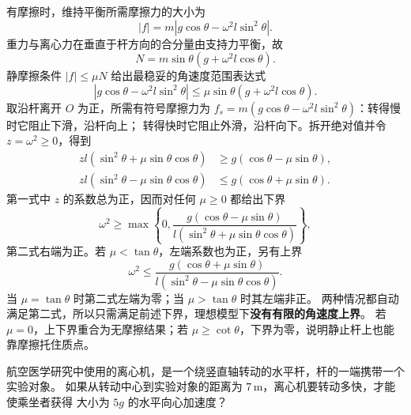 {\begin{xesolution}
有摩擦时，维持平衡所需摩擦力的大小为
\[
 |f|=m\left|g\cos\theta-\omega^2l\sin^2\theta\right|.
\]
重力与离心力在垂直于杆方向的合分量由支持力平衡，故
\[
 N=m\sin\theta\left(g+\omega^2l\cos\theta\right).
\]
静摩擦条件 $|f|\le\mu N$ 给出最稳妥的角速度范围表达式
\[
 \boxed{
 \left|g\cos\theta-\omega^2l\sin^2\theta\right|
 \le\mu\sin\theta\left(g+\omega^2l\cos\theta\right)}.
\]
取沿杆离开 $O$ 为正，所需有符号摩擦力为
$f_s=m(g\cos\theta-\omega^2l\sin^2\theta)$：转得慢时它阻止下滑，沿杆向上；
转得快时它阻止外滑，沿杆向下。拆开绝对值并令 $z=\omega^2\ge0$，得到
\begin{align*}
 zl(\sin^2\theta+\mu\sin\theta\cos\theta)&\ge g(\cos\theta-\mu\sin\theta),\\
 zl(\sin^2\theta-\mu\sin\theta\cos\theta)&\le g(\cos\theta+\mu\sin\theta).
\end{align*}
第一式中 $z$ 的系数总为正，因而对任何 $\mu\ge0$ 都给出下界
\[
 \boxed{\omega^2\ge
 \max\!\left\{0,
 \frac{g(\cos\theta-\mu\sin\theta)}
 {l(\sin^2\theta+\mu\sin\theta\cos\theta)}\right\}},
\]
第二式右端为正。若 $\mu<\tan\theta$，左端系数也为正，另有上界
\[
 \boxed{\omega^2\le
 \frac{g(\cos\theta+\mu\sin\theta)}
 {l(\sin^2\theta-\mu\sin\theta\cos\theta)}}.
\]
当 $\mu=\tan\theta$ 时第二式左端为零；当 $\mu>\tan\theta$ 时其左端非正。
两种情况都自动满足第二式，所以只需满足前述下界，理想模型下\textbf{没有有限的角速度上界}。
若 $\mu=0$，上下界重合为无摩擦结果；若 $\mu\ge\cot\theta$，下界为零，说明静止杆上也能靠摩擦托住质点。
\end{xesolution}

\clearpage
\begin{origexamplebox}{}\label{ch06:ex:s06-2-31}
航空医学研究中使用的离心机，是一个绕竖直轴转动的水平杆，杆的一端携带一个实验对象。
如果从转动中心到实验对象的距离为 $7\,\mathrm m$，离心机要转动多快，才能使乘坐者获得
大小为 $5g$ 的水平向心加速度？

\begin{qualityfigure}
\label{mech:06:31:q}
\end{qualityfigure}
\end{origexamplebox}

}
